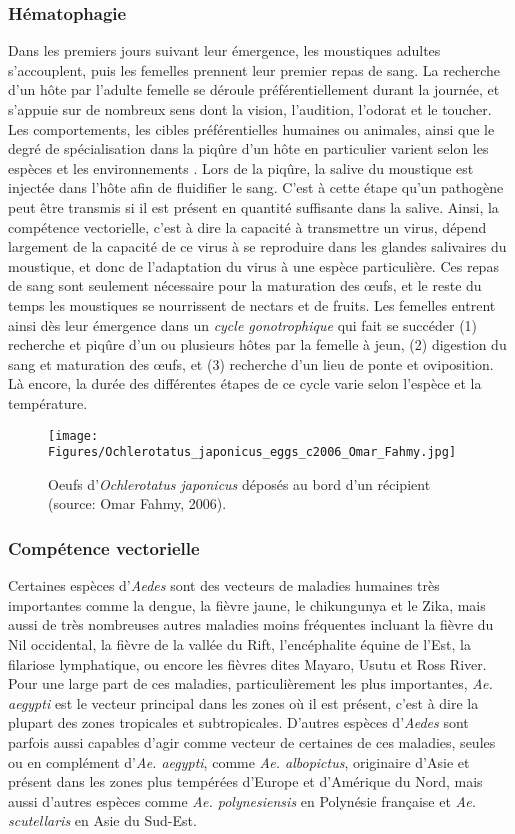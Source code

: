 \subsubsection{Hématophagie}
Dans les premiers jours suivant leur émergence, les moustiques adultes s'accouplent, puis les femelles prennent leur premier repas de sang. 
La recherche d'un hôte par l'adulte femelle se déroule préférentiellement durant la journée, et s'appuie sur de nombreux sens dont la vision, l'audition, l'odorat et le toucher. 
Les comportements, les cibles préférentielles humaines ou animales, ainsi que le degré de spécialisation dans la piqûre d'un hôte en particulier varient selon les espèces et les environnements \cite{bowen1991sensory}.
Lors de la piqûre, la salive du moustique est injectée dans l'hôte afin de fluidifier le sang. 
C'est à cette étape qu'un pathogène peut être transmis si il est présent en quantité suffisante dans la salive.
Ainsi, la compétence vectorielle, c'est à dire la capacité à transmettre un virus, dépend largement de la capacité de ce virus à se reproduire dans les glandes salivaires du moustique, et donc de l'adaptation du virus à une espèce particulière.
Ces repas de sang sont seulement nécessaire pour la maturation des \oe ufs, et le reste du temps les moustiques se nourrissent de nectars et de fruits.
Les femelles entrent ainsi dès leur émergence dans un {\em cycle gonotrophique} qui fait se succéder (1) recherche et piqûre d'un ou plusieurs hôtes par la femelle à jeun, (2) digestion du sang et maturation des \oe ufs, et (3) recherche d'un lieu de ponte et oviposition.
Là encore, la durée des différentes étapes de ce cycle varie selon l'espèce et la température.


\begin{figure}[h]
	\centering
	\texttt{[image: Figures/Ochlerotatus\_japonicus\_eggs\_c2006\_Omar\_Fahmy.jpg]}
	\caption{Oeufs d'{\em Ochlerotatus japonicus} déposés au bord d'un récipient (source: Omar Fahmy, 2006).}
	\label{fig:oeufsbord}
\end{figure}

\subsubsection{Compétence vectorielle}
Certaines espèces d'{\em Aedes} sont des vecteurs de maladies humaines très importantes comme la dengue, la fièvre jaune, le chikungunya et le Zika, mais aussi de très nombreuses autres maladies moins fréquentes incluant la fièvre du Nil occidental, la fièvre de la vallée du Rift, l'encéphalite équine de l'Est, la filariose lymphatique, ou encore les fièvres dites Mayaro, Usutu et Ross River.
Pour une large part de ces maladies, particulièrement les plus importantes, {\em Ae. aegypti} est le vecteur principal dans les zones où il est présent, c'est à dire la plupart des zones tropicales et subtropicales.
D'autres espèces d'{\em Aedes} sont parfois aussi capables d'agir comme vecteur de certaines de ces maladies, seules ou en complément d'{\em Ae. aegypti}, comme {\em Ae. albopictus}, originaire d'Asie et présent dans les zones plus tempérées d'Europe et d'Amérique du Nord, mais aussi d'autres espèces comme {\em Ae. polynesiensis} en Polynésie française et {\em Ae. scutellaris} en Asie du Sud-Est.

